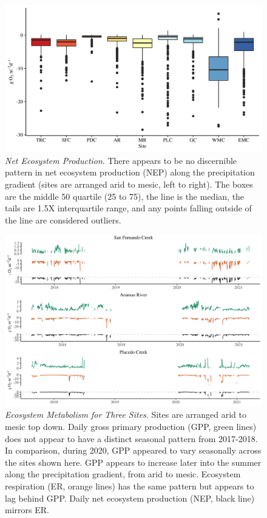 \begin{figure}[htb]
\begin{center}
\includegraphics[scale=0.2]{Figs/NEPBox.png}
\caption[Net Ecosystem Production]{\textit{Net Ecosystem Production}. There appears to be no discernible pattern in net ecosystem production (NEP) along the precipitation gradient (sites are arranged arid to mesic, left to right). The boxes are the middle 50 quartile (25 to 75), the line is the median, the tails are 1.5X interquartile range, and any points falling outside of the line are considered outliers.}
\label{fig:NEPBox}
\end{center}
\end{figure}

\begin{landscape}
\begin{figure}[htb]
\begin{center}
\includegraphics[scale=0.2]{Figs/MetabStacked.png}
\caption[Ecosystem Metabolism for Three Sites]{\textit{Ecosystem Metabolism for Three Sites}. Sites are arranged arid to mesic top down. Daily gross primary production (GPP, green lines) does not appear to have a distinct seasonal pattern  from 2017-2018. In comparison, during 2020, GPP appeared to vary seasonally across the sites shown here. GPP appears to increase later into the summer along the precipitation gradient, from arid to mesic. Ecosystem respiration (ER, orange lines) has the same pattern but appears to lag behind GPP. Daily net ecosystem production (NEP, black line) mirrors ER.}
\label{Fig:MetabStacked}
\end{center}
\end{figure}
\end{landscape}

